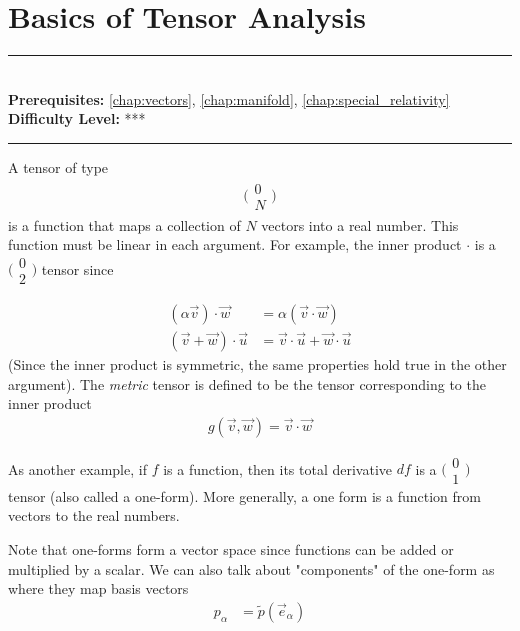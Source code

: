 \documentclass[book.tex]{subfiles}
\begin{document}
\chapter{Basics of Tensor Analysis}

\label{chap:tensor_basics}
\noindent\rule{11cm}{0.4pt} \\
\textbf{Prerequisites:} \autoref{chap:vectors}, \autoref{chap:manifold}, \autoref{chap:special_relativity}  \\
\textbf{Difficulty Level:} *** \\
\noindent\rule{11cm}{0.4pt}
\vspace{5mm}
A tensor of type 
\begin{align}
\big ( \begin{smallmatrix} 0 \\ N \end{smallmatrix} \big )
\end{align}
is a function that maps a collection of $N$ vectors into a real number. This function must be linear in each argument. For example, the inner product $\cdot$ is a $\big(\begin{smallmatrix}0 \\ 2 \end{smallmatrix} \big)$ tensor since

\begin{align}
(\alpha \vec{v}) \cdot \vec{w} &= \alpha (\vec{v} \cdot \vec{w}) \\
(\vec{v} + \vec{w}) \cdot \vec{u} &= \vec{v} \cdot \vec{u} + \vec{w} \cdot \vec{u} 
\end{align}
(Since the inner product is symmetric, the same properties hold true in the other argument). The \textit{metric} tensor is defined to be the tensor corresponding to the inner product
\begin{align}
g(\vec{v}, \vec{w}) = \vec{v} \cdot \vec{w}
\end{align}

As another example, if $f$ is a function, then its total derivative $df$ is a $\big(\begin{smallmatrix}0 \\ 1 \end{smallmatrix}\big)$ tensor (also called a one-form). More generally, a one form is a function from vectors to the real numbers.

Note that one-forms form a vector space since functions can be added or multiplied by a scalar. We can also talk about "components" of the one-form as where they map basis vectors
\begin{align}
p_{\alpha} &= \tilde{p}(\vec{e}_{\alpha})
\end{align}
\end{document}

